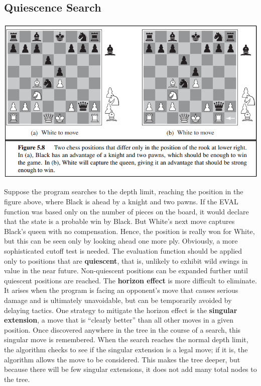 \subsection{Quiescence Search}
\begin{center}
    \includegraphics[scale=0.8]{images/quiescence.png}
\end{center}
Suppose the program searches to the depth limit, reaching the position in the figure above, where Black is ahead by a knight and two pawns. If the EVAL function was based only on the number of pieces on the board, it would declare that the state is a probable win by Black. But White’s next move captures Black’s queen with no compensation. Hence, the position is really won for White, but this can be seen only by looking ahead one more ply. Obviously, a more sophisticated cutoff test is needed. The evaluation function should be applied only to positions that are \textbf{quiescent}, that is, unlikely to exhibit wild swings in value in the near future. Non-quiescent positions can be expanded further until quiescent positions are reached.
\newline\newline
The \textbf{horizon effect} is more difficult to eliminate. It arises when the program is facing an opponent’s move that causes serious damage and is ultimately unavoidable, but can be temporarily avoided by delaying tactics. One strategy to mitigate the horizon effect is the \textbf{singular extension}, a move that is “clearly better” than all other moves in a given position. Once discovered anywhere in the tree in the course of a search, this singular move is remembered. When the search reaches the normal depth limit, the algorithm checks to see if the singular extension is a legal move; if it is, the algorithm allows the move to be considered. This makes the tree deeper, but because there will be few singular extensions, it does not add many total nodes to the tree.

